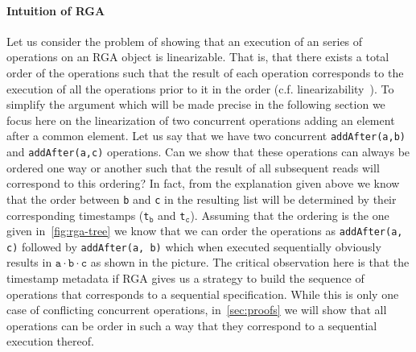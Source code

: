 \paragraph{Intuition of RGA \CRDTLinshort{}}
Let us consider the problem of showing that an execution of an series
of operations on an RGA object is linearizable.
%
That is, that there exists a total order of the operations such that
the result of each operation corresponds to the execution of all the
operations prior to it in the order (c.f.
linearizability~\cite{HerlihyW90}).
%
To simplify the argument which will be made precise in the following
section we focus here on the linearization of two concurrent
operations adding an element after a common element.
%
Let us say that we have two concurrent \lstinline|addAfter(a,b)| and
\lstinline|addAfter(a,c)| operations.
%
Can we show that these operations can always be ordered one way or
another such that the result of all subsequent reads will correspond
to this ordering?
%
In fact, from the explanation given above we know that the order
between \lstinline|b| and \lstinline|c| in the resulting list will be
determined by their corresponding timestamps
(\lstinline|t|$_{\mathtt{b}}$ and \lstinline|t|$_{\mathtt{c}}$).
%
Assuming that the ordering is the one given in~\autoref{fig:rga-tree}
we know that we can order the operations as \lstinline|addAfter(a, c)|
followed by \lstinline|addAfter(a, b)| which when executed
sequentially obviously results in $\mathtt{a \cdot b \cdot c}$ as
shown in the picture.
%
The critical observation here is that the timestamp metadata if RGA
gives us a strategy to build the sequence of operations that
corresponds to a sequential specification.
%
While this is only one case of conflicting concurrent operations,
in~\autoref{sec:proofs} we will show that all operations can be order
in such a way that they correspond to a sequential execution thereof.



